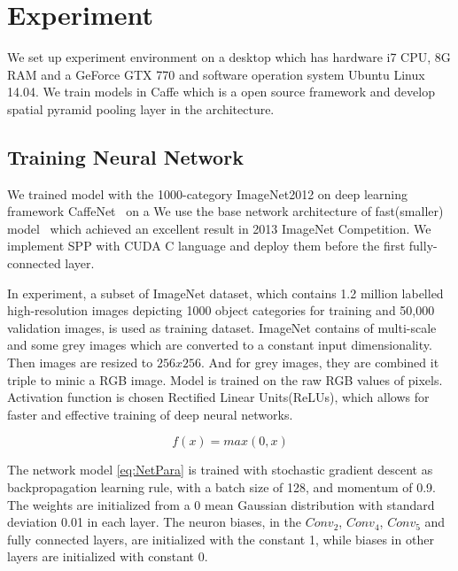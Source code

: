 
\chapter{Experiment} %
\label{Chapter4}

We set up experiment environment on a desktop which has hardware i7 CPU, 8G RAM and a GeForce GTX 770 and software operation system Ubuntu Linux 14.04. We train models in Caffe\citep{jia2014caffe} which is a open source framework and develop spatial pyramid pooling layer in the architecture.

\section{Training Neural Network}

We trained model with the 1000-category ImageNet2012 on deep learning framework CaffeNet~\cite{jia2014caffe} on a  We use the base network architecture of fast(smaller) model~\cite{ZeilerF13} which achieved an excellent result in 2013 ImageNet Competition. We implement SPP with CUDA C language and deploy them before the first fully-connected layer.

In experiment, a subset of ImageNet dataset, which contains 1.2 million labelled high-resolution images depicting 1000 object categories for training and 50,000 validation images, is used as training dataset. ImageNet contains of multi-scale and some grey images which are converted to a constant input dimensionality. Then images are resized to $256x256$. And for grey images, they are combined it triple to minic a RGB image. Model is trained on the raw RGB values of pixels. Activation function is chosen  Rectified Linear Units(ReLUs), which allows for faster and effective training of deep neural networks.

\begin{equation}\label{eq:ReLU}
f(x) = max(0, x)
\end{equation}

The network model \ref{eq:NetPara} is trained with stochastic gradient descent as backpropagation learning rule, with a batch size of 128, and momentum of 0.9. The weights are initialized from a $0$ mean Gaussian distribution with standard deviation 0.01 in each layer. The neuron biases, in the $Conv_{2}$, $Conv_{4}$, $Conv_{5}$ and fully connected layers, are initialized with the constant 1, while biases in other layers are initialized with constant 0.

